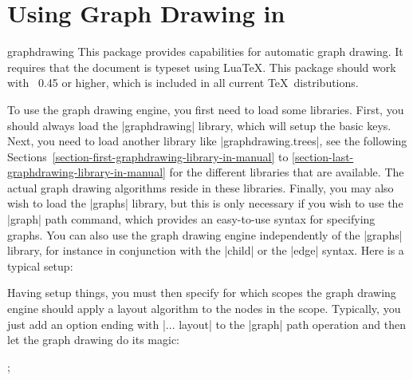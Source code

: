 %
%
%


\section{Using Graph Drawing in \tikzname}

{}

\begin{tikzlibrary}{graphdrawing}
  This package provides capabilities for automatic graph drawing. It
  requires that the document is typeset using Lua\TeX. This package
  should work with \LuaTeX\ 0.45 or higher, which is included in all
  current \TeX\ distributions. 
\end{tikzlibrary}


To use the graph drawing engine, you first need to load some
libraries. First, you should always load the |graphdrawing| library,
which will setup the basic keys. Next, you need to load another
library like |graphdrawing.trees|, see the following
Sections~\ref{section-first-graphdrawing-library-in-manual} to
\ref{section-last-graphdrawing-library-in-manual} for the different
libraries that are available. The actual graph drawing
algorithms reside in these libraries. Finally, you may also wish to
load the |graphs| library, but this is only necessary if you wish to
use the |graph| path command, which provides an easy-to-use syntax for
specifying graphs. You can also use the graph drawing engine
independently of the |graphs| library, for instance in conjunction
with the |child| or the |edge| syntax. Here is a typical setup:

\begin{codeexample}
\usetikzlibrary{graphs, graphdrawing, graphdrawing.trees}  
\end{codeexample}

Having setup things, you must then specify for which scopes the
graph drawing engine should apply a layout algorithm to the nodes in
the scope. Typically, you just add an option ending with |... layout|
to the |graph| path operation and then let the graph drawing do its
magic:

\begin{codeexample}[]
  ;    
\end{codeexample}

